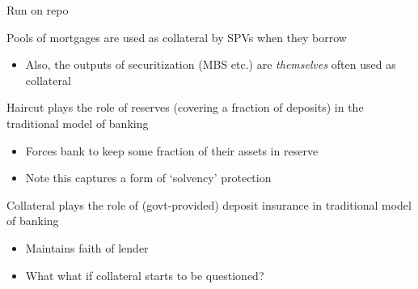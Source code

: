 \begin{frame}{Run on repo}

Pools of mortgages are used as collateral by SPVs when they borrow
\begin{itemize}
\item	Also, the outputs of securitization (MBS etc.) are \textit{themselves} often used as collateral
\end{itemize}
\vspace{2mm}
Haircut plays the role of reserves (covering a fraction of deposits) in the traditional model of banking
	\begin{itemize}
	\item	Forces bank to keep some fraction of their assets in reserve
	\item	Note this captures a form of `solvency' protection
	\end{itemize}
\vspace{2mm}
Collateral plays the role of (govt-provided) deposit insurance in traditional model of banking
\begin{itemize}
\item	Maintains faith of lender
\item	What what if collateral starts to be questioned?
\end{itemize}

\end{frame}



